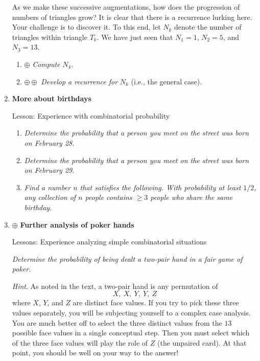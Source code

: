 \begin{enumerate}
As we make these successive augmentations, how does the progression of numbers of triangles grow?  It is clear that there is a recurrence lurking here.  Your challenge is to discover it.  To this end, let $N_k$ denote the number of triangles within triangle $T_k$.  We have just seen that $N_1 =1$, $N_2 = 5$, and $N_3 = 13$.
  \begin{enumerate}
  \item
$\oplus$
{\em Compute} $N_4$.
  \medskip\item
$\oplus \oplus$
{\em Develop a recurrence for} $N_k$ (i.e., the general case).
  \end{enumerate}


\medskip\item
{\bf More about birthdays}

{\sc Lesson:} Experience with combinatorial probability

\smallskip

  \begin{enumerate}
  \item
{\em Determine the probability that a person you meet on the street was born on February 28.}
  \medskip\item
{\em Determine the probability that a person you meet on the street was born on February 29.} 
  \medskip\item
{\em Find a number $n$ that satisfies the following.  With probability at least $1/2$, any collection of $n$ people contains $\geq 3$ people who share the same birthday}.
  \end{enumerate}  
  

\medskip\item
$\oplus$
{\bf Further analysis of poker hands}

{\sc Lessons:} Experience analyzing simple combinatorial situations

\smallskip

{\em Determine the probability of being dealt a two-pair hand in a fair game of poker.}

\smallskip

{\em Hint}.  As noted in the text, a two-pair hand is any permutation of
\[ X, \ X, \ Y, \ Y, \ Z \]
where $X$, $Y$, and $Z$ are distinct face values.  If you try to pick these three values separately, you will be subjecting yourself to a complex case analysis.  You are much better off to select the three distinct values from the $13$ possible face values in a single conceptual step.  Then you must select which of the three face values will play the role of $Z$ (the unpaired card). 
At that point, you should be well on your way to the answer!


\end{enumerate}
